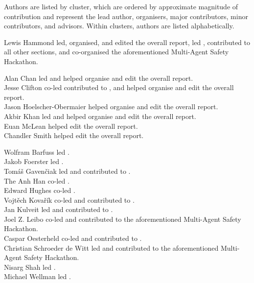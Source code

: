 Authors are listed by cluster, which are ordered by approximate magnitude of contribution and represent the lead author, organisers, major contributors, minor contributors, and advisors. Within clusters, authors are listed alphabetically.

{Lewis Hammond} led, organised, and edited the overall report, led , contributed to all other sections, and co-organised the aforementioned Multi-Agent Safety Hackathon.

{Alan Chan} led  and helped organise and edit the overall report.\\
{Jesse Clifton} co-led  contributed to , and helped organise and edit the overall report.\\
{Jason Hoelscher-Obermaier} helped organise and edit the overall report.\\
{Akbir Khan} led  and helped organise and edit the overall report.\\
{Euan McLean} helped edit the overall report.\\
{Chandler Smith} helped edit the overall report.

{Wolfram Barfuss} led .\\
{Jakob Foerster} led .\\
{Tomáš Gavenčiak} led  and contributed to .\\
{The Anh Han} co-led .\\
{Edward Hughes} co-led .\\
{Vojtěch Kovařík} co-led  and contributed to .\\
{Jan Kulveit} led  and contributed to .\\
{Joel Z. Leibo} co-led  and contributed to the aforementioned Multi-Agent Safety Hackathon.\\
{Caspar Oesterheld} co-led  and contributed to .\\
{Christian Schroeder de Witt} led  and contributed to the aforementioned Multi-Agent Safety Hackathon.\\
{Nisarg Shah} led .\\
{Michael Wellman} led .

